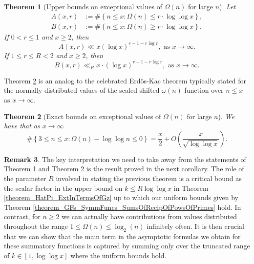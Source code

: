 \documentclass[11pt,reqno,a4letter]{article}
\numberwithin{figure}{section}
\numberwithin{table}{section}
\theoremstyle{plain}
\newtheorem{theorem}{Theorem}
\numberwithin{theorem}{section}
\theoremstyle{definition}
\newtheorem{remark}[theorem]{Remark}
\begin{document}
\begin{theorem}[Upper bounds on exceptional values of $\Omega(n)$ for large $n$] 
\label{theorem_MV_Thm7.20-init_stmt} 
Let 
\begin{align*} 
A(x, r) & := \#\left\{n \leq x: \Omega(n) \leq r \cdot \log\log x\right\}, \\ 
B(x, r) & := \#\left\{n \leq x: \Omega(n) \geq r \cdot \log\log x\right\}. 
\end{align*} 
If $0 < r \leq 1$ and $x \geq 2$, then 
\[
A(x, r) \ll x (\log x)^{r-1 - r\log r}, \text{ \ as\ } x \rightarrow \infty. 
\]
If $1 \leq r \leq R < 2$ and $x \geq 2$, then 
\[
B(x, r) \ll_R x \cdot (\log x)^{r-1-r \log r}, \text{ \ as\ } x \rightarrow \infty. 
\]
\end{theorem} 

Theorem \ref{theorem_MV_Thm7.21-init_stmt} is an analog to the 
celebrated Erd\"os-Kac theorem typically stated for the 
normally distributed values of the scaled-shifted $\omega(n)$ function over $n \leq x$ as 
$x \rightarrow \infty$. 

\begin{theorem}[Exact bounds on exceptional values of $\Omega(n)$ for large $n$] 
\label{theorem_MV_Thm7.21-init_stmt} 
We have that as $x \rightarrow \infty$ 
\[
\#\left\{3 \leq n \leq x: \Omega(n) - \log\log n \leq 0\right\} = 
     \frac{x}{2} + O\left(\frac{x}{\sqrt{\log\log x}}\right). 
\]
\end{theorem} 

\begin{remark} 
The key interpretation we need to take away from the statements 
of Theorem \ref{theorem_MV_Thm7.20-init_stmt} and 
Theorem \ref{theorem_MV_Thm7.21-init_stmt} 
is the result proved in the next corollary. 
The role of the parameter $R$ involved in stating the previous theorem 
is a critical bound as the scalar factor in the upper bound on $k \leq R\log\log x$ in 
Theorem \ref{theorem_HatPi_ExtInTermsOfGz} up to which our uniform bounds given by 
Theorem \ref{theorem_GFs_SymmFuncs_SumsOfRecipOfPowsOfPrimes} hold. 
In contrast, for $n \geq 2$ we can actually 
have contributions from values distributed throughout the range $1 \leq \Omega(n) \leq \log_2(n)$ 
infinitely often. 
It is then crucial that we can show that the main term in the asymptotic formulas we obtain 
for these summatory functions is captured by summing only over the truncated range of 
$k \in [1, \log\log x]$ where the uniform bounds hold. 
\end{remark} 
\end{document}
